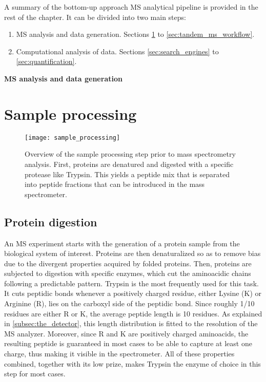 \documentclass[thesis]{subfiles}
\begin{document}
A summary of the bottom-up approach MS analytical pipeline is provided in the rest of the chapter. It can be divided into two main steps:

\begin{enumerate}

\item \ac{MS} analysis and data generation. Sections \ref{sec:sample_processing} to \ref{sec:tandem_ms_workflow}.

\item Computational analysis of data. Sections \ref{sec:search_engines} to \ref{sec:quantification}.

\end{enumerate}

\LARGE
\textbf{MS analysis and data generation}
\normalsize

\section{Sample processing}
\label{sec:sample_processing}

\begin{figure}[!h]
\texttt{[image: sample\_processing]}
\caption{Overview of the sample processing step prior to mass spectrometry analysis. First, proteins are denatured and digested with a specific protease like Trypsin. This yields a peptide mix that is separated into peptide fractions that can be introduced in the mass spectrometer.}
\label{fig:sample_processing}
\end{figure}

\subsection{Protein digestion}
\label{subsec:protein_digestion}

An \ac{MS} experiment starts with the generation of a protein sample from the biological system of interest. Proteins are then denaturalized  so as to remove bias due to the divergent properties acquired by folded proteins. Then, proteins are subjected to digestion with specific enzymes, which cut the aminoacidic chains following a predictable pattern. Trypsin is the most frequently used for this task. It cuts peptidic bonds whenever a positively charged residue, either Lysine (K) or Arginine (R), lies on the carboxyl side of the peptidic bond. Since roughly 1/10 residues are either R or K, the average peptide length is 10 residues. As explained in \ref{subsec:the_detector}, this length distribution is fitted to the resolution of the MS analyzer. Moreover, since R and K are positively charged aminoacids, the resulting peptide is guaranteed in most cases to be able to capture at least one charge, thus making it visible in the spectrometer. All of these properties combined, together with its low prize, makes Trypsin the enzyme of choice in this step for most cases.
\end{document}
